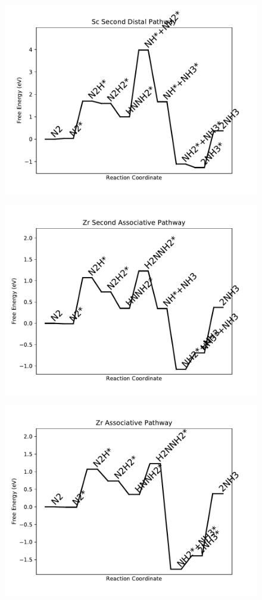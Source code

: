 \begin{figure}
\centering
\includegraphics[width=0.8\linewidth]{data/plots/Sc_distal_2.pdf}
\end{figure}

\begin{figure}
\centering
\includegraphics[width=0.8\linewidth]{data/plots/Zr_associative_2.pdf}
\end{figure}

\begin{figure}
\centering
\includegraphics[width=0.8\linewidth]{data/plots/Zr_associative.pdf}
\end{figure}


